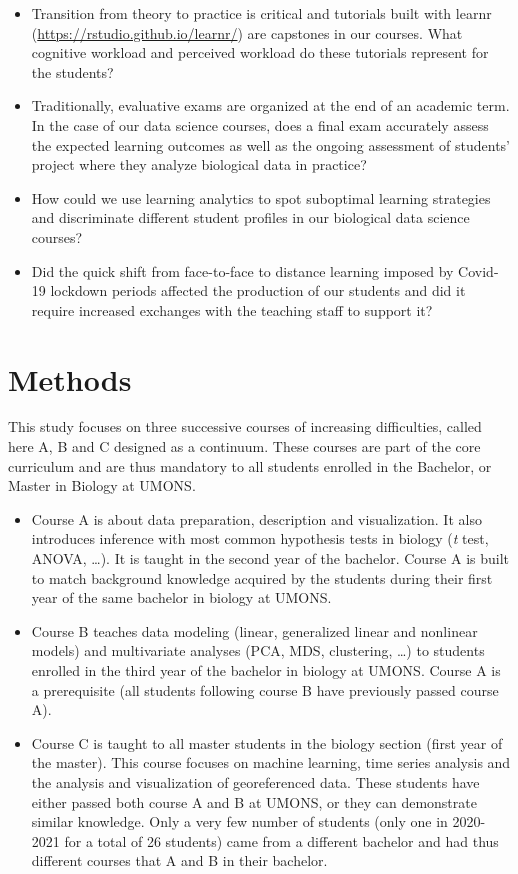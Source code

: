 \documentclass{aims}
\theoremstyle{definition}
\begin{document}
\begin{itemize}
\item
  Transition from theory to practice is critical and tutorials built
  with learnr (\url{https://rstudio.github.io/learnr/}) are capstones in
  our courses. What cognitive workload and perceived workload do these
  tutorials represent for the students?
\item
  Traditionally, evaluative exams are organized at the end of an
  academic term. In the case of our data science courses, does a final
  exam accurately assess the expected learning outcomes as well as the
  ongoing assessment of students' project where they analyze biological
  data in practice?
\item
  How could we use learning analytics to spot suboptimal learning
  strategies and discriminate different student profiles in our
  biological data science courses?
\item
  Did the quick shift from face-to-face to distance learning imposed by
  Covid-19 lockdown periods affected the production of our students and
  did it require increased exchanges with the teaching staff to support
  it?
\end{itemize}

\hypertarget{methods}{%
\section{Methods}\label{methods}}

This study focuses on three successive courses of increasing
difficulties, called here A, B and C designed as a continuum. These
courses are part of the core curriculum and are thus mandatory to all
students enrolled in the Bachelor, or Master in Biology at UMONS.

\begin{itemize}
\item
  Course A is about data preparation, description and visualization. It
  also introduces inference with most common hypothesis tests in biology
  (\emph{t} test, ANOVA, \ldots). It is taught in the second year of the
  bachelor. Course A is built to match background knowledge acquired by
  the students during their first year of the same bachelor in biology
  at UMONS.
\item
  Course B teaches data modeling (linear, generalized linear and
  nonlinear models) and multivariate analyses (PCA, MDS, clustering,
  \ldots) to students enrolled in the third year of the bachelor in
  biology at UMONS. Course A is a prerequisite (all students following
  course B have previously passed course A).
\item
  Course C is taught to all master students in the biology section
  (first year of the master). This course focuses on machine learning,
  time series analysis and the analysis and visualization of
  georeferenced data. These students have either passed both course A
  and B at UMONS, or they can demonstrate similar knowledge. Only a very
  few number of students (only one in 2020-2021 for a total of 26
  students) came from a different bachelor and had thus different
  courses that A and B in their bachelor.
\end{itemize}
\end{document}
